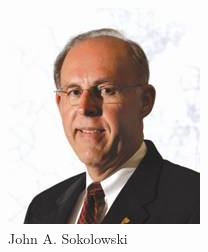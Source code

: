 \documentclass{article}
\begin{document}
\begin{figure}[H]
\begin{minipage}[H]{0.3\linewidth}
    \includegraphics[width=\textwidth]{../ressources/john_sokolowski}
    \caption{John A. Sokolowski}
\end{minipage}
\hfill
\end{figure}
\end{document}

